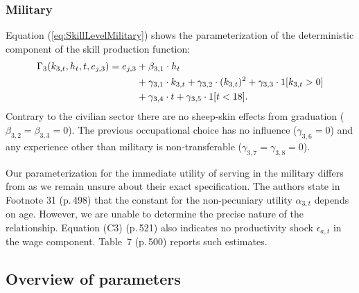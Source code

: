 \subsubsection*{Military}
Equation (\ref{eq:SkillLevelMilitary}) shows the parameterization of the deterministic component of the skill production function:
%
\begin{align}\label{eq:SkillLevelMilitary}
    \Gamma_3( k_{3,t}, h_t, t, e_{j,3}) = e_{j,3} & + \beta_{3,1} \cdot h_t  \\\nonumber
	               \nonumber &+ \gamma_{3,1} \cdot  k_{3,t} + \gamma_{3,2} \cdot (k_{3,t})^2 + \gamma_{3,3} \cdot 1[k_{3,t} > 0]\\\nonumber
									 & + \gamma_{3,4} \cdot t + \gamma_{3,5} \cdot 1[t < 18].
\end{align}
%
Contrary to the civilian sector there are no sheep-skin effects from graduation ($\beta_{3,2} = \beta_{3,3}= 0$). The previous occupational choice has no influence ($\gamma_{3,6}= 0$) and any experience other than military is non-transferable ($\gamma_{3,7} = \gamma_{3,8} = 0$).

\begin{Remark} Our parameterization for the immediate utility of serving in the military differs from \citet{Keane.1997} as we remain unsure about their exact specification. The authors state in Footnote 31 (p.\,498) that the constant for the non-pecuniary utility $\alpha_{3,t}$ depends on age. However, we are unable to determine the precise nature of the relationship. Equation (C3) (p.\,521) also indicates no productivity shock $\epsilon_{a,t}$ in the wage component. Table~7 (p.\,500) reports such estimates.
\end{Remark}
\clearpage
\FloatBarrier\subsection{Overview of parameters}
\nopagebreak

